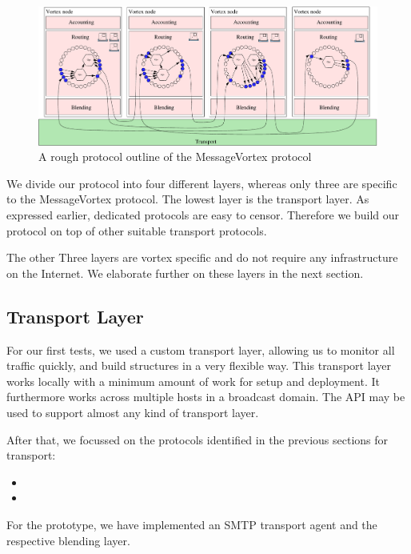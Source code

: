 \begin{figure}[ht!]
	\centering\includegraphics[width=\columnwidth]{inc/roughProtocolDesign.pdf}
	\caption{A rough protocol outline of the MessageVortex protocol}\label{fig:protocolOutline}
\end{figure}

We divide our protocol into four different layers, whereas only three are specific to the MessageVortex protocol. The lowest layer is the transport layer. As expressed earlier, dedicated protocols are easy to censor. Therefore we build our protocol on top of other suitable transport protocols. 

The other Three layers are vortex specific and do not require any infrastructure on the Internet. We elaborate further on these layers in the next section.

\subsection{Transport Layer}
For our first tests, we used a custom transport layer, allowing us to monitor all traffic quickly, and build structures in a very flexible way. This transport layer works locally with a minimum amount of work for setup and deployment. It furthermore works across multiple hosts in a broadcast domain. The API may be used to support almost any kind of transport layer.

After that, we focussed on the protocols identified in the previous sections for transport:
\begin{itemize}
	\item {}
	\item {}
\end{itemize}
For the prototype, we have implemented an SMTP transport agent and the respective blending layer.

